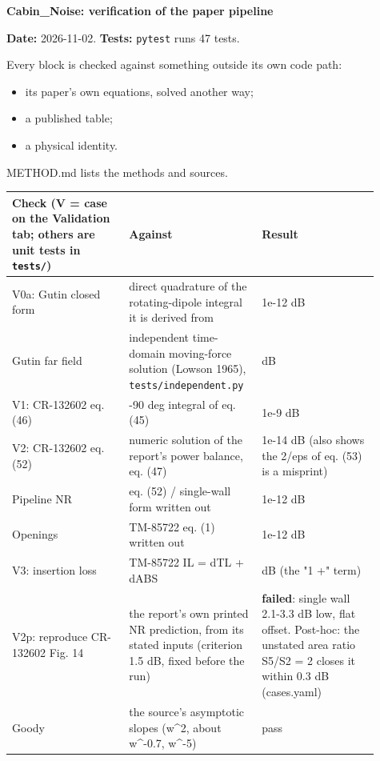 \documentclass[10pt,a4paper]{article}
\begin{document}
{\LARGE\bfseries Cabin\_Noise: verification of the paper pipeline\par}\bigskip

\textbf{Date:} 2026-11-02. \textbf{Tests:} \texttt{pytest} runs 47 tests.

Every block is checked against something outside its own code path:

\begin{itemize}
\item its paper's own equations, solved another way;
\item a published table;
\item a physical identity.
\end{itemize}

METHOD.md lists the methods and sources.

{\small
\begin{longtable}{>{\raggedright\arraybackslash}p{0.303\linewidth}>{\raggedright\arraybackslash}p{0.303\linewidth}>{\raggedright\arraybackslash}p{0.303\linewidth}}
\hline
\textbf{Check (V = case on the Validation tab; others are unit tests in \texttt{tests/\allowbreak{}})} & \textbf{Against} & \textbf{Result} \\
\hline
\endhead
V0a: Gutin closed form & direct quadrature of the rotating-dipole integral it is derived from & 1e-12 dB \\
Gutin far field & independent time-domain moving-force solution (Lowson 1965), \texttt{tests/\allowbreak{}independent.\allowbreak{}py} & 0.1 dB \\
V1: CR-132602 eq. (46) & 0-90 deg integral of eq. (45) & 1e-9 dB \\
V2: CR-132602 eq. (52) & numeric solution of the report's power balance, eq. (47) & 1e-14 dB (also shows the 2/eps of eq. (53) is a misprint) \\
Pipeline NR & eq. (52) / single-wall form written out & 1e-12 dB \\
Openings & TM-85722 eq. (1) written out & 1e-12 dB \\
V3: insertion loss & TM-85722 IL = dTL + dABS & 0.28 dB (the "1 +" term) \\
V2p: reproduce CR-132602 Fig. 14 & the report's own printed NR prediction, from its stated inputs (criterion 1.5 dB, fixed before the run) & \textbf{failed}: single wall 2.1-3.3 dB low, flat offset. Post-hoc: the unstated area ratio S5/S2 = 2 closes it within 0.3 dB (cases.yaml) \\
Goody & the source's asymptotic slopes (w\textasciicircum{}2, about w\textasciicircum{}-0.7, w\textasciicircum{}-5) & pass \\

\end{longtable}}
\end{document}
